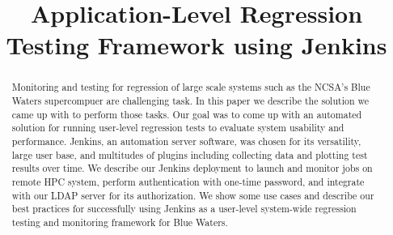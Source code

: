 \documentclass[10pt, conference, compsocconf]{IEEEtran}
\begin{document}
\title{Application-Level Regression Testing Framework using Jenkins}





%

\author{

\and

}

\maketitle
\thispagestyle{plain}

\begin{abstract}
Monitoring and testing for regression of large scale systems such as the NCSA's Blue Waters supercompuer are challenging task. 
In this paper we describe the solution we came up with to perform those tasks. 
Our goal was to come up with an automated solution for running user-level regression tests to evaluate system usability and performance.
Jenkins, an automation server software, was chosen for its versatility, large user base, and multitudes of plugins including collecting data and plotting test results over time. 
We describe our Jenkins deployment to launch and monitor jobs on remote HPC system, perform authentication with one-time password, and integrate with our LDAP server for its authorization. 
We show some use cases and describe our best practices for successfully using Jenkins as a user-level system-wide regression testing and monitoring framework for Blue Waters.

\end{abstract}
\end{document}
